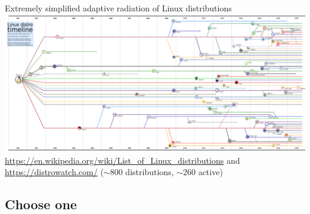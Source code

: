 \documentclass[compress, ucs, xelatex, 11pt, xcolor=svgnames,
  hyperref={
    bookmarks=true,
    unicode=true,
    colorlinks=true,
    pdftitle={Linux, command line and MetaCentrum},
    plainpages=false,
    pdfauthor={Vojtech Zeisek},
    pdfsubject={Course about use of Linux command line, writing shell scripts and using MetaCentrum of CESNET},
    pdfcreator={XeLaTeX},
    pdfkeywords={Linux, GNU, BASH, shell, command line, MetaCentrum},
    linkcolor=DarkRed,
    anchorcolor=DarkBlue,
    citecolor=Indigo,
    filecolor=NavyBlue,
    menucolor=DarkMagenta,
    urlcolor=DarkBlue,
    pdftex},
  url={hyphens, lowtilde} %
  ]{beamer}
\begin{document}
\begin{frame}{Extremely simplified adaptive radiation of Linux distributions}
  \includegraphics[width=\textwidth]{linux_fylogen_2.png}
  \vfil
  \url{https://en.wikipedia.org/wiki/List_of_Linux_distributions} and \url{https://distrowatch.com/} ($\sim$800 distributions, $\sim$260 active)
  \vfill
\end{frame}

\subsection{Choose one}
\end{document}
